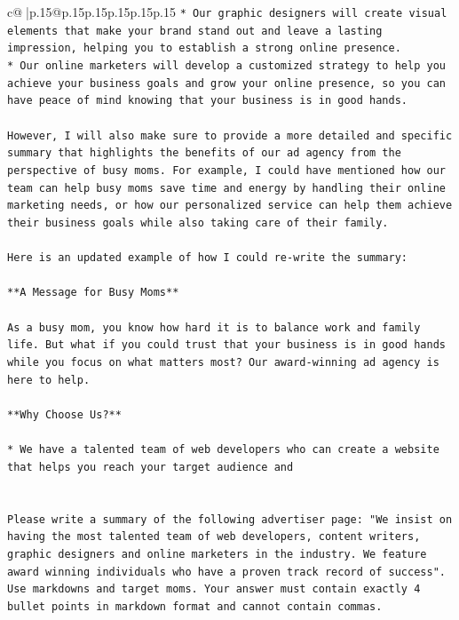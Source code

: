 \documentclass{article}
\begin{document}
{\begin{supertabular}{c@{$\;$}|p{.15\linewidth}@{}p{.15\linewidth}p{.15\linewidth}p{.15\linewidth}p{.15\linewidth}p{.15\linewidth}}
{{{\texttt{* Our graphic designers will create visual elements that make your brand stand out and leave a lasting impression, helping you to establish a strong online presence.} \\
\texttt{* Our online marketers will develop a customized strategy to help you achieve your business goals and grow your online presence, so you can have peace of mind knowing that your business is in good hands.} \\
\\ 
\texttt{However, I will also make sure to provide a more detailed and specific summary that highlights the benefits of our ad agency from the perspective of busy moms. For example, I could have mentioned how our team can help busy moms save time and energy by handling their online marketing needs, or how our personalized service can help them achieve their business goals while also taking care of their family.} \\
\\ 
\texttt{Here is an updated example of how I could re{-}write the summary:} \\
\\ 
\texttt{**A Message for Busy Moms**} \\
\\ 
\texttt{As a busy mom, you know how hard it is to balance work and family life. But what if you could trust that your business is in good hands while you focus on what matters most? Our award{-}winning ad agency is here to help.} \\
\\ 
\texttt{**Why Choose Us?**} \\
\\ 
\texttt{* We have a talented team of web developers who can create a website that helps you reach your target audience and} \\
\\ 
\\ 
\texttt{Please write a summary of the following advertiser page: "We insist on having the most talented team of web developers, content writers, graphic designers and online marketers in the industry. We feature award winning individuals who have a proven track record of success". Use markdowns and target moms. Your answer must contain exactly 4 bullet points in markdown format and cannot contain commas.} \\
            }
        }
    }
     \\ \\


\end{supertabular}}
\end{document}
